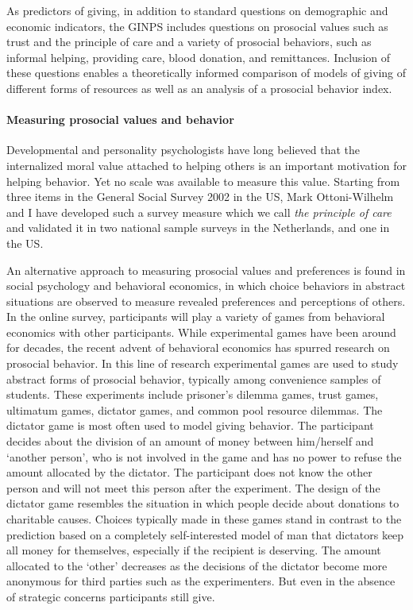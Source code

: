 \documentclass[twocolumn, serif, rga, numeric]{jote-article}
\begin{document}
As predictors of giving, in addition to standard questions on demographic and economic indicators, the GINPS includes questions on prosocial values such as trust and the principle of care and a variety of prosocial behaviors, such as informal helping, providing care, blood donation, and remittances. Inclusion of these questions enables a theoretically informed comparison of models of giving of different forms of resources\cite{Bekkers2006, Lee1999} as well as an analysis of a prosocial behavior index.\cite{Wilhelm2010, Hardy2005}

\paragraph{Measuring prosocial values and behavior}

Developmental and personality psychologists have long believed that the internalized moral value attached to helping others is an important motivation for helping behavior.\cite{Hoffman2000, Eisenberg1982} Yet no scale was available to measure this value. Starting from three items in the General Social Survey 2002 in the US\cite{Wilhelm2010}, Mark Ottoni-Wilhelm and I have developed such a survey measure which we call \emph{the principle of care} and validated it in two national sample surveys in the Netherlands, and one in the US.\cite{Bekkers2016}

An alternative approach to measuring prosocial values and preferences is found in social psychology and behavioral economics, in which choice behaviors in abstract situations are observed to measure revealed preferences and perceptions of others.\cite{VanLange2013} In the online survey, participants will play a variety of games from behavioral economics with other participants. While experimental games have been around for decades, the recent advent of behavioral economics has spurred research on prosocial behavior.\cite{Wilson2011} In this line of research experimental games are used to study abstract forms of prosocial behavior, typically among convenience samples of students. These experiments include prisoner's dilemma games, trust games, ultimatum games, dictator games, and common pool resource dilemmas.\cite{VanLange2013} The dictator game is most often used to model giving behavior.\cite{Camerer2003} The participant decides about the division of an amount of money between him/herself and `another person', who is not involved in the game and has no power to refuse the amount allocated by the dictator. The participant does not know the other person and will not meet this person after the experiment. The design of the dictator game resembles the situation in which people decide about donations to charitable causes.
Choices typically made in these games stand in contrast to the prediction based on a completely self-interested model of man that dictators keep all money for themselves, especially if the recipient is deserving.\cite{Eckel1996} The amount allocated to the `other' decreases as the decisions of the dictator become more anonymous for third parties such as the experimenters.\cite{Eichenberger1998}
But even in the absence of strategic concerns participants still give.\cite{Engel2011}
\end{document}
